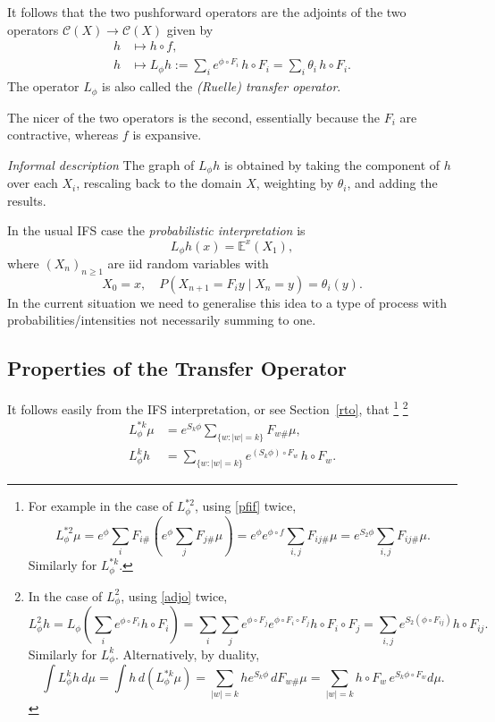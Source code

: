 \documentclass[a4paper]{amsart}
\theoremstyle{plain}
\theoremstyle{definition}
\theoremstyle{remark}
\begin{document}
\bigskip It follows that the two pushforward operators are the adjoints of the two operators $ \mathcal{C} (X) \to \mathcal{C} (X) $ given by
\begin{equation} \label{adjo}
\begin{aligned}
h &\mapsto h \circ f, \\
h & \mapsto L_\phi h  := \sum_i e^{\phi\circ F_i}  \, h\circ F_i  = \sum_i \theta_i\,  h\circ F_i .
 \end{aligned} 
\end{equation} 
The operator $ L_\phi$ is also called the \emph{(Ruelle) transfer operator}.

\bigskip The nicer of the  two operators is the second, essentially because the $ F_i $ are contractive, whereas $ f $ is expansive.

\bigskip \emph{Informal description} The graph of $ L_\phi h $ is obtained by taking the component of $ h $ over each $ X_i  $, rescaling back to the domain $ X $, weighting by $ \theta_i$, and adding the results.

\bigskip In the usual IFS case the \emph{probabilistic interpretation} is 
\[ L_\phi h (x) = \mathbb{E} ^x(X_1), \]
where $ (X_n)_{n\geq 1}  $ are iid random variables with 
\[  X_0 = x , \quad P(X_{n+1}= F_i y \mid  X_n = y) = \theta_i(y). \]
In the current situation we need to generalise this idea to a type of process with probabilities/intensities not necessarily summing to one. 


\subsection{Properties of the Transfer Operator}
It follows easily from the IFS interpretation, or see Section~\ref{rto}, that%
\footnote{For example in the case of $ L^{*2}_\phi$, using \eqref{pfif} twice,
\[
L^{*2}_\phi\mu  = e^\phi \sum_i F_{i\#}\left( e^\phi\sum_jF_{j\#} \mu \right)  
  = e^\phi e^{\phi\circ f} \sum_{i,j} F_{ij\#}\mu 
   = e^{S_2 \phi}  \sum_{i,j} F_{ij\#}\mu .
\]
Similarly for $ L^{*k}_\phi$.}
\footnote{In the case of  $L^2_\phi$, using  \eqref{adjo} twice,  
\[
L^2_\phi  h = L_\phi\left(\sum_ie^{\phi\circ F_i}h\circ F_i\right)
= \sum_i\sum_j e^{\phi\circ F_j}e^{\phi\circ F_i \circ F_j} h\circ F_i\circ F_j 
= \sum_{i,j} e^{S_2(\phi\circ F_{ij})}h\circ F_{ij}.
\]
Similarly for $ L^{k}_\phi$.   
Alternatively, by duality,
\[ 
\int L^k_\phi h \, d\mu = \int h \,  d\left( L^{*k}_\phi \mu\right) 
= \sum_{|w|=k} h  e^{S_k\phi}\, dF_{w\#}\mu 
= \sum_{|w|=k} h \circ F_w\, e^{S_k\phi\circ F_w}  d \mu .
\] 
}
\begin{equation} \label{itto}
\begin{aligned} 
L_\phi^{*k}  \mu &= e^{S_k\phi}\sum_{\{w:|w|=k\}}F_{w\#}\mu,\\
 L_\phi^{k}  h &= \sum_{\{w:|w|=k\}}e^{(S_k\phi)\circ F_w  }\, h\circ F_ w .
\end{aligned} 
\end{equation} 
\end{document}
